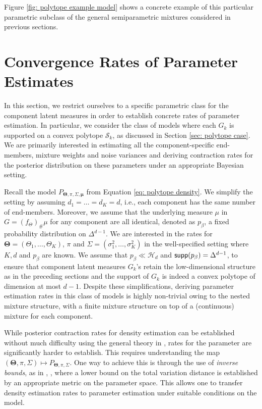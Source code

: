 \documentclass[bj,authoryear]{imsart}
\theoremstyle{plain}
\theoremstyle{remark}
\def\bTheta{{\boldsymbol\Theta}}
\def\bmu{{\boldsymbol\mu}}
\def\cH{\mathcal{H}}
\def\cS{\mathcal{S}}
\def\supp{{\sf supp}}
\def\bTheta{\boldsymbol{\Theta}}
\begin{document}
Figure \ref{fig: polytope example model} shows a concrete example of this particular parametric subclass of the general semiparametric mixtures considered in previous sections.

\section{Convergence Rates of Parameter Estimates}\label{sec:posterior_contraction}

In this section, we restrict ourselves to a specific parametric class for the component latent measures in order to establish concrete rates of parameter estimation. In particular, we consider the class of models where each $G_k$ is supported on a convex polytope $\cS_k$, as discussed in Section \ref{sec: polytope case}. We are primarily interested in estimating all the component-specific end-members, mixture weights and noise variances and deriving contraction rates for the posterior distribution on these parameters under an appropriate Bayesian setting.

Recall the model $P_{\bTheta,\pi,\Sigma,\bmu}$ from Equation \eqref{eq: polytope density}. We simplify the setting by assuming $d_1=\dots=d_K=d$, i.e., each component has the same number of end-members. Moreover, we assume that the underlying measure $\mu$ in $G=(f_{\Theta})_{\#}\mu$ for any component are all identical, denoted as $p_\beta$, a fixed probability distribution on $\Delta^{d-1}$. We are interested in the rates for $\bTheta=(\Theta_1,\dots,\Theta_K)$, $\pi$ and $\Sigma=(\sigma_1^2,\dots,\sigma_K^2)$ in the well-specified setting where $K, d$ and $p_\beta$ are known. We assume that $p_\beta \ll \cH_d$ and $\supp(p_{\beta}) = \Delta^{d-1}$, to ensure that component latent measures $G_k$'s retain the low-dimensional structure as in the preceding sections and the support of $G_k$ is indeed a convex polytope of dimension at most $d-1$. Despite these simplifications, deriving parameter estimation rates in this class of models is highly non-trivial owing to the nested mixture structure, with a finite mixture structure on top of a (continuous) mixture for each component. 

While posterior contraction rates for density estimation can be established without much difficulty using the general theory in \cite{ghosal2017fundamentals}, rates for the parameter are significantly harder to establish. This requires understanding the map $(\bTheta,\pi,\Sigma) \mapsto P_{\bTheta,\pi,\Sigma}$. One way to achieve this is through the use of \textit{inverse bounds}, as in \cite{nguyen2013convergence}, \cite{nguyen2015posterior}, where a lower bound on the total variation distance is established by an appropriate metric on the parameter space. This allows one to transfer density estimation rates to parameter estimation under suitable conditions on the model. 
\end{document}
